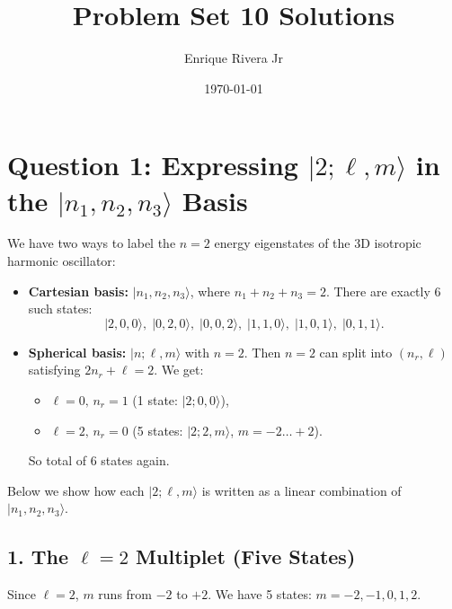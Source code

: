 \documentclass[12pt]{article}
\begin{document}
\title{Problem Set 10 Solutions}
\author{Enrique Rivera Jr}
\date{\today}

\maketitle


\section*{Question 1: Expressing $|2; \ell,m\rangle$ in the $|n_1,n_2,n_3\rangle$ Basis}

We have two ways to label the $n=2$ energy eigenstates of the 3D isotropic harmonic oscillator:
\begin{itemize}
  \item \textbf{Cartesian basis:} $|n_1,n_2,n_3\rangle$, where $n_1+n_2+n_3=2$. There are exactly 6 such states:
  \begin{equation*}
    |2,0,0\rangle,\;|0,2,0\rangle,\;|0,0,2\rangle,\;|1,1,0\rangle,\;|1,0,1\rangle,\;|0,1,1\rangle.
  \end{equation*}
  \item \textbf{Spherical basis:} $|n;\ell,m\rangle$ with $n=2$. Then $n=2$ can split into $(n_r,\ell)$ satisfying $2n_r+\ell=2$. We get:
  \begin{itemize}
    \item $\ell=0,\,n_r=1$ (1 state: $|2;0,0\rangle$),
    \item $\ell=2,\,n_r=0$ (5 states: $|2;2,m\rangle$, $m=-2\dots+2$).
  \end{itemize}
  So total of 6 states again.
\end{itemize}

Below we show how each $|2;\ell,m\rangle$ is written as a linear combination of $|n_1,n_2,n_3\rangle$.

\subsection*{1. The $\ell=2$ Multiplet (Five States)}
Since $\ell=2$, $m$ runs from $-2$ to $+2$. We have 5 states: $m=-2,-1,0,1,2$.
\end{document}
